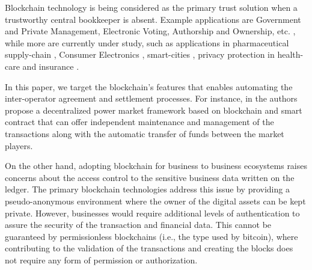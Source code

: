 \documentclass[conference]{IEEEtran}
\begin{document}
Blockchain technology is being considered as the primary trust solution when a trustworthy central bookkeeper is absent. Example applications are Government and Private Management, Electronic Voting, Authorship and Ownership, etc. \cite{8552978}, while more are currently under study, such as applications in pharmaceutical supply-chain \cite{7987376}, Consumer Electronics \cite{8386955}, smart-cities \cite{8386958}, privacy protection in health-care \cite{8386918} and insurance \cite{8386868}. %


In this paper, we target the blockchain's features that enables automating the inter-operator agreement and settlement processes. For instance, in \cite{8368442} the authors propose a decentralized power market framework based on blockchain and smart contract that can offer independent maintenance and management of the transactions along with the automatic transfer of funds between the market players.

On the other hand, adopting blockchain for business to business ecosystems raises concerns about the access control to the sensitive business data written on the ledger. The primary blockchain technologies address this issue by providing a pseudo-anonymous environment where the owner of the digital assets can be kept private. However, businesses would require additional levels of authentication to assure the security of the transaction and financial data. 
This cannot be guaranteed by permissionless blockchains (i.e., the type used by bitcoin), where contributing to the validation of the transactions and creating the blocks does not require any form of permission or authorization.
\end{document}
